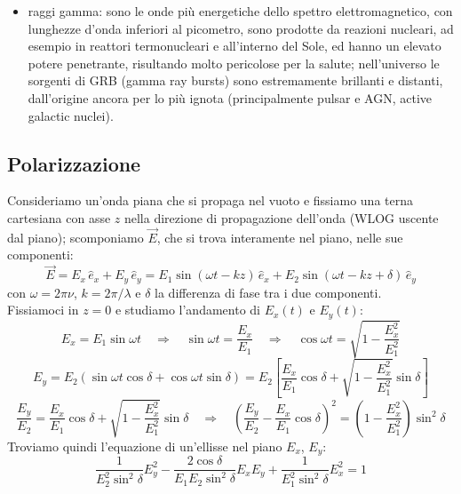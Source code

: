 \begin{itemize}
	\item raggi gamma: sono le onde più energetiche dello spettro elettromagnetico, con lunghezze d'onda inferiori al picometro, sono prodotte da reazioni nucleari, ad esempio in reattori termonucleari e all'interno del Sole, ed hanno un elevato potere penetrante, risultando molto pericolose per la salute; nell'universo le sorgenti di GRB (gamma ray bursts) sono estremamente brillanti e distanti, dall'origine ancora per lo più ignota (principalmente pulsar e AGN, active galactic nuclei).
\end{itemize}

\subsection{Polarizzazione}

Consideriamo un'onda piana che si propaga nel vuoto e fissiamo una terna cartesiana con asse $ z $ nella direzione di propagazione dell'onda (WLOG uscente dal piano); scomponiamo $ \vec{E} $, che si trova interamente nel piano, nelle sue componenti:
\begin{equation}
	\vec{E} = E_x \,\hat{e}_x + E_y \,\hat{e}_y = E_1 \sin(\omega t - kz) \,\hat{e}_x + E_2 \sin(\omega t - kz + \delta) \,\hat{e}_y
	\label{eq:24}
\end{equation}
con $ \omega = 2\pi \nu $, $ k = 2\pi / \lambda $ e $ \delta $ la differenza di fase tra i due componenti. \\ 
%
Fissiamoci in $ z = 0 $ e studiamo l'andamento di $ E_x(t) $ e $ E_y(t) $:
\begin{equation}
	E_x = E_1 \sin \omega t \quad\Longrightarrow\quad \sin \omega t = \frac{E_x}{E_1} \quad\Longrightarrow\quad \cos \omega t = \sqrt{1 - \frac{E_x^2}{E_1^2}}
	\label{eq:25}
\end{equation}
\begin{equation}
	E_y = E_2 \left(\sin \omega t \cos \delta + \cos \omega t \sin \delta\right) = E_2 \left[ \frac{E_x}{E_1} \cos \delta + \sqrt{1 - \frac{E_x^2}{E_1^2}} \sin \delta\right]
	\label{eq:26}
\end{equation}
\begin{equation}
	\frac{E_y}{E_2} = \frac{E_x}{E_1} \cos \delta + \sqrt{1 - \frac{E_x^2}{E_1^2}} \sin \delta \quad\Longrightarrow\quad \left(\frac{E_y}{E_2} - \frac{E_x}{E_1} \cos \delta\right)^2 = \left(1 - \frac{E_x^2}{E_1^2}\right) \sin^2 \delta
	\label{eq:27}
\end{equation}
Troviamo quindi l'equazione di un'ellisse nel piano $ E_x $, $ E_y $:
\begin{equation}
	\frac{1}{E_2^2 \sin^2 \delta} E_y^2 - \frac{2\cos \delta}{E_1 E_2 \sin^2 \delta} E_x E_y + \frac{1}{E_1^2 \sin^2 \delta} E_x^2 = 1
	\label{eq:28}
\end{equation}
